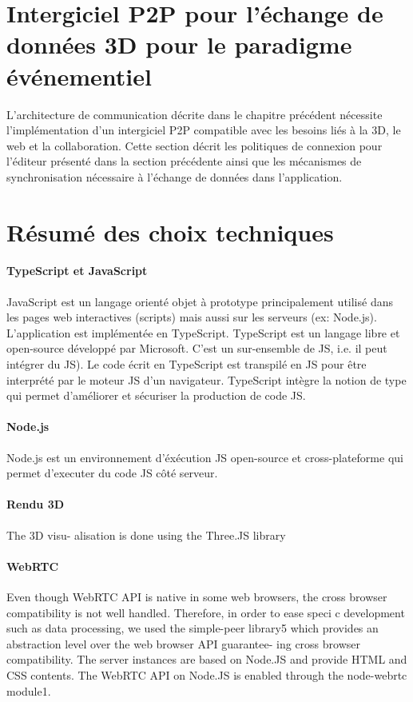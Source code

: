 

\section{Intergiciel P2P pour l'échange de données 3D pour le paradigme 
événementiel}

L'architecture de communication décrite dans le chapitre précédent nécessite 
l'implémentation d'un intergiciel \gls{P2P} compatible avec les besoins liés à la 
3D, le web et la collaboration. Cette section décrit les politiques de connexion 
pour l'éditeur présenté dans la section précédente ainsi que les mécanismes de 
synchronisation nécessaire à l'échange de données dans l'application. 




\section{Résumé des choix techniques}

\paragraph{TypeScript et JavaScript}
JavaScript est un langage orienté objet à prototype principalement utilisé dans 
les pages web interactives (scripts) mais aussi sur les serveurs (ex: Node.js).
L'application est implémentée en TypeScript. TypeScript est un langage libre et 
open-source développé par Microsoft. C'est un sur-ensemble de \gls{JS}, i.e. il 
peut intégrer du \gls{JS}). Le code écrit en TypeScript est transpilé en \gls{JS} 
pour être interprété par le moteur \gls{JS} d'un navigateur. TypeScript intègre la 
notion de type qui permet d'améliorer et sécuriser la 
production de code \gls{JS}.


\paragraph{Node.js}
Node.js est un environnement d'éxécution \gls{JS} open-source et 
cross-plateforme qui permet d'executer du code \gls{JS} côté serveur. 

\paragraph{Rendu 3D}The 3D visu- alisation is done using the Three.JS library
\paragraph{WebRTC}
Even though WebRTC API is native in some web browsers, the cross browser 
compatibility is not well handled. 
Therefore, in order to ease speci c development such as data processing, we used 
the simple-peer library5 which provides an abstraction level over the web browser 
API guarantee- ing cross browser compatibility. The server instances are based on 
Node.JS and provide HTML and CSS contents. The WebRTC API on Node.JS is 
enabled through the node-webrtc module1.

